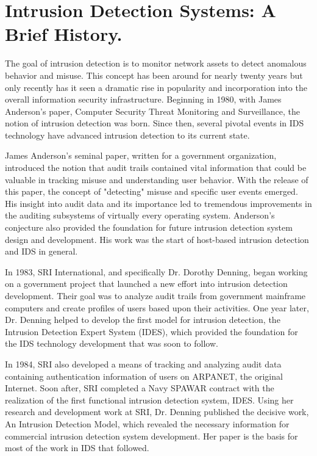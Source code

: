 \documentclass[thesis=M,english]{FITthesis}[2011/07/15]
\begin{document}
\section{Intrusion Detection Systems: A Brief History.}
The goal of intrusion detection is to monitor network assets to detect anomalous behavior and misuse. This concept has been around for nearly twenty years but only recently has it seen a dramatic rise in popularity and incorporation into the overall information security infrastructure. Beginning in 1980, with James Anderson's paper, Computer Security Threat Monitoring and Surveillance, the notion of intrusion detection was born. Since then, several pivotal events in IDS technology have advanced intrusion detection to its current state.

James Anderson's seminal paper, written for a government organization, introduced the notion that audit trails contained vital information that could be valuable in tracking misuse and understanding user behavior. With the release of this paper, the concept of "detecting" misuse and specific user events emerged. His insight into audit data and its importance led to tremendous improvements in the auditing subsystems of virtually every operating system. Anderson's conjecture also provided the foundation for future intrusion detection system design and development. His work was the start of host-based intrusion detection and IDS in general.

In 1983, SRI International, and specifically Dr. Dorothy Denning, began working on a government project that launched a new effort into intrusion detection development. Their goal was to analyze audit trails from government mainframe computers and create profiles of users based upon their activities. One year later, Dr. Denning helped to develop the first model for intrusion detection, the Intrusion Detection Expert System (IDES), which provided the foundation for the IDS technology development that was soon to follow.

In 1984, SRI also developed a means of tracking and analyzing audit data containing authentication information of users on ARPANET, the original Internet. Soon after, SRI completed a Navy SPAWAR contract with the realization of the first functional intrusion detection system, IDES. Using her research and development work at SRI, Dr. Denning published the decisive work, An Intrusion Detection Model, which revealed the necessary information for commercial intrusion detection system development. Her paper is the basis for most of the work in IDS that followed.
\end{document}

